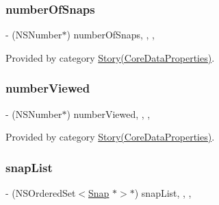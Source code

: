 \hypertarget{interface_story_a274932e7cc41214730b2b9bd11b31de2}{}\label{interface_story_a274932e7cc41214730b2b9bd11b31de2} 
\subsubsection{\texorpdfstring{number\+Of\+Snaps}{numberOfSnaps}}
{\footnotesize\ttfamily -\/ (N\+S\+Number$\ast$) number\+Of\+Snaps\hspace{0.3cm}{\ttfamily [read]}, {\ttfamily [write]}, {\ttfamily [nonatomic]}, {\ttfamily [retain]}}



Provided by category \hyperlink{category_story_07_core_data_properties_08_a274932e7cc41214730b2b9bd11b31de2}{Story(\+Core\+Data\+Properties)}.

\hypertarget{interface_story_a5810378b61cd9f5b2b951440c8ca2db5}{}\label{interface_story_a5810378b61cd9f5b2b951440c8ca2db5} 
\subsubsection{\texorpdfstring{number\+Viewed}{numberViewed}}
{\footnotesize\ttfamily -\/ (N\+S\+Number$\ast$) number\+Viewed\hspace{0.3cm}{\ttfamily [read]}, {\ttfamily [write]}, {\ttfamily [nonatomic]}, {\ttfamily [retain]}}



Provided by category \hyperlink{category_story_07_core_data_properties_08_a5810378b61cd9f5b2b951440c8ca2db5}{Story(\+Core\+Data\+Properties)}.

\hypertarget{interface_story_a4616dbf24fe3c6c6f5482aea92cedd57}{}\label{interface_story_a4616dbf24fe3c6c6f5482aea92cedd57} 
\subsubsection{\texorpdfstring{snap\+List}{snapList}}
{\footnotesize\ttfamily -\/ (N\+S\+Ordered\+Set$<$\hyperlink{interface_snap}{Snap} $\ast$$>$$\ast$) snap\+List\hspace{0.3cm}{\ttfamily [read]}, {\ttfamily [write]}, {\ttfamily [nonatomic]}, {\ttfamily [retain]}}




